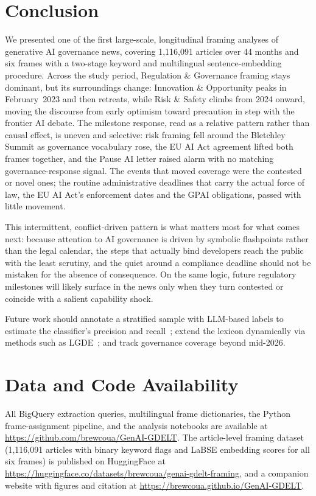 \documentclass[sigconf]{acmart}
\begin{document}
\section{Conclusion}

We presented one of the first large-scale, longitudinal framing analyses of generative AI governance news, covering 1,116,091 articles over 44 months and six frames with a two-stage keyword and multilingual sentence-embedding procedure.
Across the study period, Regulation \& Governance framing stays dominant, but its surroundings change: Innovation \& Opportunity peaks in February~2023 and then retreats, while Risk \& Safety climbs from 2024 onward, moving the discourse from early optimism toward precaution in step with the frontier AI debate.
The milestone response, read as a relative pattern rather than causal effect, is uneven and selective: risk framing fell around the Bletchley Summit as governance vocabulary rose, the EU AI Act agreement lifted both frames together, and the Pause AI letter raised alarm with no matching governance-response signal.
The events that moved coverage were the contested or novel ones; the routine administrative deadlines that carry the actual force of law, the EU AI Act's enforcement dates and the GPAI obligations, passed with little movement.

This intermittent, conflict-driven pattern is what matters most for what comes next: because attention to AI governance is driven by symbolic flashpoints rather than the legal calendar, the steps that actually bind developers reach the public with the least scrutiny, and the quiet around a compliance deadline should not be mistaken for the absence of consequence.
On the same logic, future regulatory milestones will likely surface in the news only when they turn contested or coincide with a salient capability shock.

Future work should annotate a stratified sample with LLM-based labels to estimate the classifier's precision and recall~\cite{gilardi_chatgpt_2023,ziems_can_2024}; extend the lexicon dynamically via methods such as LGDE~\cite{schindler_lgde_2025}; and track governance coverage beyond mid-2026.

\section{Data and Code Availability}
All BigQuery extraction queries, multilingual frame dictionaries, the Python frame-assignment pipeline, and the analysis notebooks are available at \url{https://github.com/brewcoua/GenAI-GDELT}.
The article-level framing dataset (1,116,091 articles with binary keyword flags and LaBSE embedding scores for all six frames) is published on HuggingFace at \url{https://huggingface.co/datasets/brewcoua/genai-gdelt-framing}, and a companion website with figures and citation at \url{https://brewcoua.github.io/GenAI-GDELT}.
\end{document}
